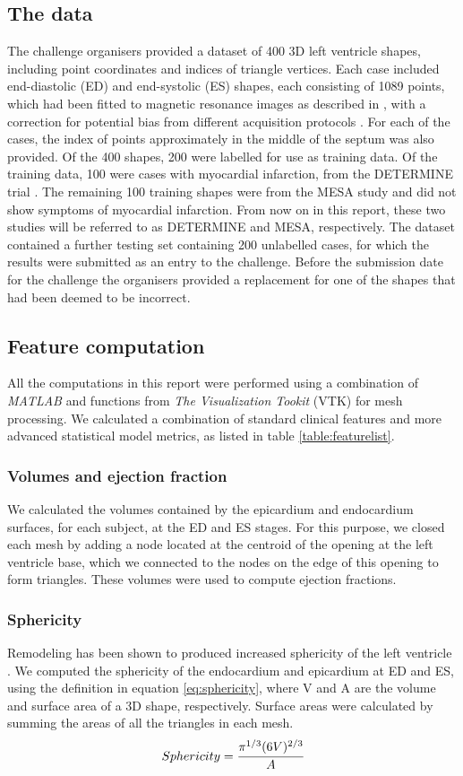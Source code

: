 \documentclass{llncs}
\begin{document}
	\subsection{The data}
The challenge organisers provided a dataset of 400 3D left ventricle shapes, including point coordinates and indices of triangle vertices. Each case included end-diastolic (ED) and end-systolic (ES) shapes, each consisting of 1089 points, which had been fitted to magnetic resonance images as described in \cite{Young2000}, with a correction for potential bias from different acquisition protocols \cite{Medrano-Gracia2013}. For each of the cases, the index of points approximately in the middle of the septum was also provided. Of the 400 shapes, 200 were labelled for use as training data. Of the training data, 100 were cases with myocardial infarction, from the DETERMINE trial \cite{Kadish2009}. The remaining 100 training shapes were from the MESA study \cite{Bild2002} and did not show symptoms of myocardial infarction. From now on in this report, these two studies will be referred to as DETERMINE and MESA, respectively. The dataset contained a further testing set containing 200 unlabelled cases, for which the results were submitted as an entry to the challenge. Before the submission date for the challenge the organisers provided a replacement for one of the shapes that had been deemed to be incorrect. 
	\subsection{Feature computation}
	All the computations in this report were performed using a combination of \emph{MATLAB} \cite{MATLAB2015} and functions from  \emph{The Visualization Tookit} (VTK) \cite{Schroeder2006} for mesh processing. We calculated a combination of standard clinical features and more advanced statistical model metrics, as listed in table \ref{table:featurelist}.
	\subsubsection{Volumes and ejection fraction}
We calculated the volumes contained by the epicardium and endocardium surfaces, for each subject, at the ED and ES stages. For this purpose, we closed each mesh by adding a node located at the centroid of the opening at the left ventricle base, which we connected to the nodes on the edge of this opening to form triangles. These volumes were used to compute ejection fractions. 
\subsubsection{Sphericity}Remodeling has been shown to produced increased sphericity of the left ventricle \cite{Sutton2000}. We  computed the sphericity \cite{Wadell1933} of the endocardium and epicardium at ED and ES, using the definition in equation \ref{eq:sphericity}, where V and A are the volume and surface area of a 3D shape, respectively. Surface areas were calculated by summing the areas of all the triangles in each mesh.
\begin{equation} \label{eq:sphericity}
 Sphericity = \cfrac{\pi^{1/3}(6V)^{2/3}}{A} 
\end{equation}
\end{document}
